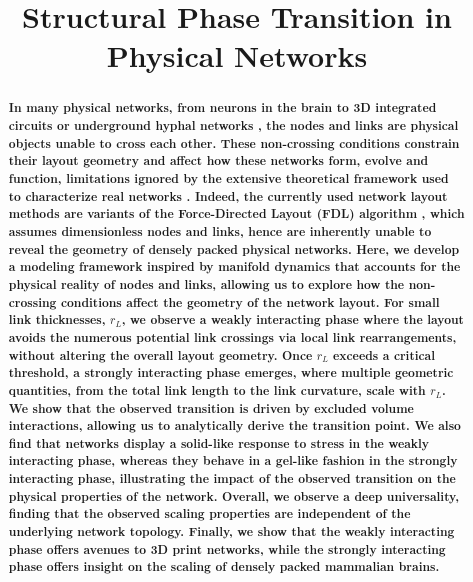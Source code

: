 \documentclass[nofootinbib,preprint,floatfix,titlepage,superscriptaddress]{revtex4} %
\newcommand{\outNim}[1]{}
\newcommand{\finV}[2]{#2}
\begin{document}
\linespread{1.2}
\title{\Large Structural Phase Transition in Physical Networks}
\outNim{
\medskip
\centerline{Nima Dehmamy\footnote{nidami@gmail.com}, Soodabeh Milanlouei, Albert-L\'aszl\'o Barab\'asi}
\centerline{\today}
\bigskip
}
  \begin{abstract}
{\bf 
In many physical networks, from neurons in the brain \cite{kasthuri12015saturated,oh2014mesoscale} to 3D integrated circuits \cite{wong2007monolithic} %
or underground hyphal networks %
\cite{friese1991spread}, the nodes and links are physical objects unable to cross each other.
These non-crossing conditions constrain their layout geometry and affect how these networks form, evolve and function, limitations ignored by the  
extensive theoretical framework used to characterize real networks \cite{barrat2008dynamical,caldarelli2012networks,cohen2010complex,dorogovtsev2013evolution}. %
Indeed, the currently used network layout methods are variants of the Force-Directed Layout (FDL) algorithm \cite{kamada1989algorithm,fruchterman1991graph}, %
which assumes dimensionless nodes and links, hence are inherently unable to reveal the geometry of densely packed physical networks.
Here, we develop a modeling framework inspired by manifold dynamics that accounts for the physical reality of nodes and links, allowing us to 
explore how the non-crossing conditions affect the geometry of the network layout. 
For small link thicknesses, $r_L$, we observe a weakly interacting phase where the layout avoids the numerous potential link crossings via local link rearrangements, without altering the overall layout geometry. 
Once $r_L$ exceeds a critical threshold, a strongly interacting phase emerges, where multiple geometric quantities, from the total link length to the link curvature, scale with $r_L$. 
We show that the observed transition is driven by excluded volume interactions, allowing us to analytically derive the transition point.
We also find that networks display a solid-like response to stress in the weakly interacting phase,  whereas they behave in a gel-like fashion in the strongly interacting phase, illustrating the impact of the observed transition on the physical properties of the network. 
Overall, we 
observe a deep universality, finding that the observed scaling properties are independent of the underlying network topology. 
Finally, we show that the weakly interacting phase offers avenues to 3D print networks, while the strongly interacting phase offers insight on the scaling of densely packed mammalian brains.

} 
\end{abstract}
\finV{\maketitle}{}
\end{document}

